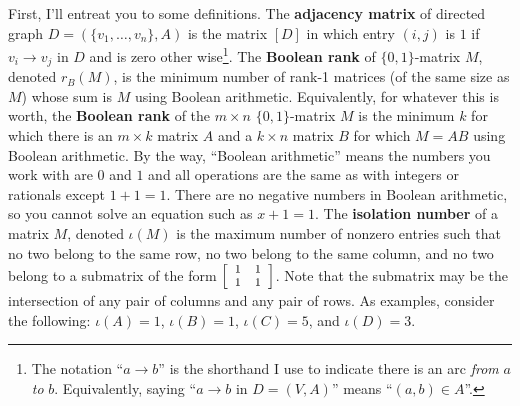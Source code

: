 \documentclass[10pt, AMS Euler]{article}
\begin{document}
	\noindent First, I'll entreat you to some definitions.  
	The {\bf adjacency matrix} of directed graph $D = (\{v_1, \dots, v_n\},A)$ is the matrix $[D]$ in which entry $(i,j)$ is $1$ if $v_i \to v_j$ in $D$ and is zero other wise\footnote{The notation ``$a \to b$'' is the shorthand I use to indicate there is an arc \emph{from} $a$ \emph{to} $b$.  Equivalently, saying ``$a \to b$ in $D = (V,A)$'' means ``$(a,b) \in A$''.}. 
	The {\bf Boolean rank} of $\{0,1\}$-matrix $M$, denoted $r_{B}(M)$, is the minimum number of rank-1 matrices (of the same size as $M$) whose sum is $M$ using Boolean arithmetic.  
	Equivalently, for whatever this is worth, the {\bf Boolean rank} of the $m \times n$ $\{0,1\}$-matrix $M$ is the minimum $k$ for which there is an $m \times k$ matrix  $A$ and a $k \times n$ matrix $B$ for which $M  = AB$ using Boolean arithmetic.  
	By the way, ``Boolean arithmetic'' means the numbers you work with are $0$ and $1$ and all operations are the same as with integers or rationals except $1+1=1$.  
	There are no negative numbers in Boolean arithmetic, so you cannot solve an equation such as $x +1 = 1$. 
	The {\bf isolation number} of a matrix $M$, denoted $\iota(M)$ is the maximum number of nonzero entries such that no two belong to the same row, no two belong to the same column, and no two belong to a submatrix of the form ${\footnotesize \left[\begin{array}{cc} 1 & 1 \\ 1 & 1\end{array} \right]}$. 
	Note that the submatrix may be  the intersection of any pair of columns and any pair of rows. 
	As examples, consider the following: $\iota(A) = 1$, $\iota(B) = 1$, $\iota(C) = 5$, and $\iota(D) =3$.
\end{document}
